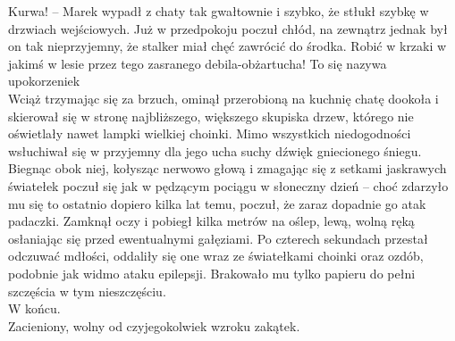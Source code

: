 \documentclass[../MAIN.tex]{subfiles}
\begin{document}
\xx Kurwa! -- Marek wypadł z chaty tak gwałtownie i szybko, że stłukł szybkę w drzwiach wejściowych.
\qd
Już w przedpokoju poczuł chłód, na zewnątrz jednak był on tak nieprzyjemny, że stalker miał chęć zawrócić do środka. Robić w krzaki w jakimś w lesie przez tego zasranego debila-obżartucha! To się nazywa upokorzenie\3k\\
Wciąż trzymając się za brzuch, ominął przerobioną na kuchnię chatę dookoła i skierował się w stronę najbliższego, większego skupiska drzew, którego nie oświetlały nawet lampki wielkiej choinki. Mimo wszystkich niedogodności wsłuchiwał się w przyjemny dla jego ucha suchy dźwięk gniecionego śniegu.\\
Biegnąc obok niej, kołysząc nerwowo głową i zmagając się z setkami jaskrawych światełek poczuł się jak w pędzącym pociągu w słoneczny dzień -- choć zdarzyło mu się to ostatnio dopiero kilka lat temu, poczuł, że zaraz dopadnie go atak padaczki. Zamknął oczy i pobiegł kilka metrów na oślep, lewą, wolną ręką osłaniając się przed ewentualnymi gałęziami. Po czterech sekundach przestał odczuwać mdłości, oddaliły się one wraz ze światełkami choinki oraz ozdób, podobnie jak widmo ataku epilepsji. Brakowało mu tylko papieru do pełni szczęścia w tym nieszczęściu.\\
W końcu.\\
Zacieniony, wolny od czyjegokolwiek wzroku zakątek.
\end{document}
